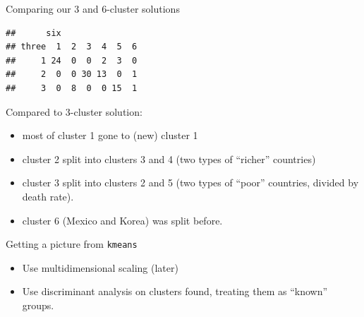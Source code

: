 \documentclass[ignorenonframetext,]{beamer}
\newenvironment{Shaded}{\begin{snugshade}}{\end{snugshade}}
\newcommand{\DataTypeTok}[1]{\textcolor[rgb]{0.13,0.29,0.53}{#1}}
\newcommand{\KeywordTok}[1]{\textcolor[rgb]{0.13,0.29,0.53}{\textbf{#1}}}
\newcommand{\NormalTok}[1]{#1}
\newcommand{\OperatorTok}[1]{\textcolor[rgb]{0.81,0.36,0.00}{\textbf{#1}}}
\begin{document}
\begin{frame}[fragile]{Comparing our 3 and 6-cluster solutions}
\protect\hypertarget{comparing-our-3-and-6-cluster-solutions}{}

\begin{Shaded}
\end{Shaded}

\begin{verbatim}
##      six
## three  1  2  3  4  5  6
##     1 24  0  0  2  3  0
##     2  0  0 30 13  0  1
##     3  0  8  0  0 15  1
\end{verbatim}

Compared to 3-cluster solution:

\begin{itemize}
\item
  most of cluster 1 gone to (new) cluster 1
\item
  cluster 2 split into clusters 3 and 4 (two types of ``richer''
  countries)
\item
  cluster 3 split into clusters 2 and 5 (two types of ``poor''
  countries, divided by death rate).
\item
  cluster 6 (Mexico and Korea) was split before.
\end{itemize}

\end{frame}

\begin{frame}{Getting a picture from \texttt{kmeans}}
\protect\hypertarget{getting-a-picture-from-kmeans}{}

\begin{itemize}
\item
  Use multidimensional scaling (later)
\item
  Use discriminant analysis on clusters found, treating them as
  ``known'' groups.
\end{itemize}

\end{frame}
\end{document}
